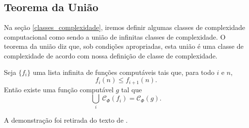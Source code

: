\subsection{Teorema da União}

Na seção \ref{classes_complexidade},
iremos definir algumas classes de complexidade computacional
como sendo a união de infinitas classes de complexidade.
O teorema da união diz que,
sob condições apropriadas,
esta união é uma classe de complexidade
de acordo com nossa definição de classe de complexidade.

\begin{theorem}
    \label{teorema_da_uniao}
    Seja $\{f_i\}$ uma lista infinita de funções computáveis
    tais que, para todo $i$ e $n$,
    \begin{equation*}
        f_i(n) \leq f_{i+1}(n).
    \end{equation*}
    Então existe uma função computável $g$
    tal que
    \begin{equation*}
        \bigcup_i \ \mathcal C_\Phi(f_i) = \mathcal C_\Phi(g).
    \end{equation*}
\end{theorem}

A demonstração foi retirada do texto de .

